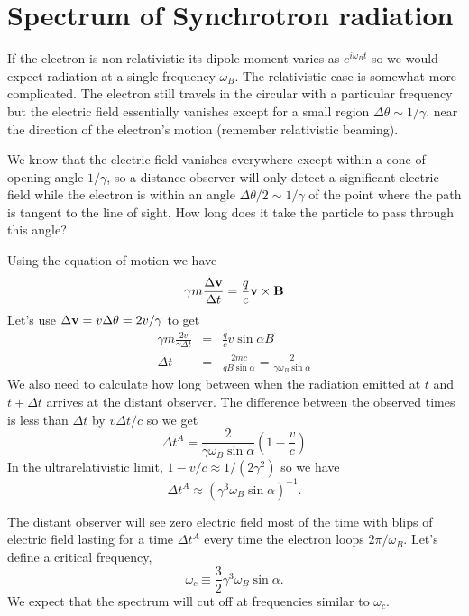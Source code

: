 \section{Spectrum of Synchrotron radiation}
\label{sec:spectr-synchr-radi}

If the electron is non-relativistic its dipole moment varies as
$e^{i\omega_B t}$ so we would expect radiation at a single frequency
$\omega_B$.   The relativistic case is somewhat more complicated.
The electron still travels in the circular with a particular frequency
but the electric field essentially vanishes except for a small region
$\Delta \theta \sim 1/\gamma$. near the direction of the electron's
motion (remember relativistic beaming).

We know that the electric field vanishes everywhere except within a cone
of opening angle $1/\gamma$, so a distance observer will only detect a
significant electric field while the electron is within an angle
$\Delta \theta/2 \sim 1/\gamma$ of the point where the path is tangent
to the line of sight.   How long does it take the particle to pass
through this angle?

Using the equation of motion we have
\begin{equation}
\gamma m \frac{\Delta {\bf v}}{\Delta t} = \frac{q}{c} {\bf v} \times
       {\bf B}
\label{eq:367}
\end{equation}
Let's use ${\Delta {\bf v}}=v \Delta \theta=2 v/\gamma$ to get
\begin{eqnarray}
\gamma m \frac{2 v}{\gamma \Delta t} &=& \frac{q}{c} v \sin \alpha B
\\
\Delta t &=& \frac{2 m c}{q B \sin\alpha} = \frac{2}{\gamma \omega_B \sin\alpha}
\label{eq:368}
\end{eqnarray}
We also need to calculate how long between when the radiation emitted
at $t$ and $t+\Delta t$ arrives at the distant observer.   The
difference between the observed times is less than $\Delta t$ by
$v \Delta t/c$ so we get
\begin{equation}
\Delta t^A = \frac{2}{\gamma \omega_B \sin\alpha} \left ( 1 -
\frac{v}{c} \right )
\label{eq:369}
\end{equation}
In the ultrarelativistic limit, $1-v/c \approx 1/(2\gamma^2)$ so we
have
\begin{equation}
\Delta t^A \approx \left ( \gamma^3 \omega_B \sin\alpha \right )^{-1}.
\label{eq:370}
\end{equation}

The distant observer will see zero electric field most of the time
with blips of electric field lasting for a time $\Delta t^A$ every
time the electron loops $2\pi/\omega_B$.   Let's define a critical
frequency,
\begin{equation}
\omega_c \equiv \frac{3}{2} \gamma^3 \omega_B \sin\alpha.
\label{eq:371}
\end{equation}
We expect that the spectrum will cut off at frequencies similar to
$\omega_c$. 

